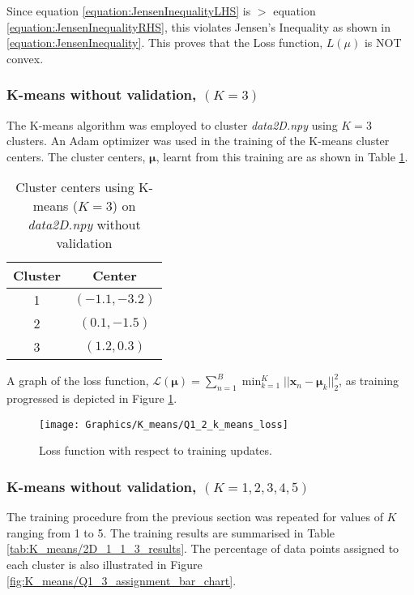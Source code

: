 \documentclass[a4paper,12pt]{article}
\newcommand{\x}{\mathbf{x}}
\newcommand{\means}{\bm{\mu}}
\begin{document}
Since equation \ref{equation:JensenInequalityLHS} is $>$ equation \ref{equation:JensenInequalityRHS}, this violates Jensen's Inequality as shown in \ref{equation:JensenInequality}. This proves that the Loss function, $L(\mu)$ is NOT convex. 

\clearpage
\subsubsection{K-means without validation, $(K = 3)$}
\label{sec:K_means/Q1.2_without_validation}
The K-means algorithm was employed to cluster \textit{data2D.npy} using $K = 3$ clusters. An Adam optimizer was used in the training of the K-means cluster centers. The cluster centers, $\means$, learnt from this training are as shown in Table \ref{tab:K_means/2D_1_1_2_centers}.

\begin{table}[!htb]
\centering
\caption{Cluster centers using K-means ($K=3$) on \textit{data2D.npy} without validation}
\label{tab:K_means/2D_1_1_2_centers}
\vspace{1em}
\begin{tabular}{|c|c|} \hline
Cluster & Center \\ \hline
1 & $(-1.1, -3.2)$ \\
2 & $(0.1, -1.5)$ \\
3 & $(1.2, 0.3)$ \\ \hline
\end{tabular}
\end{table}

A graph of the loss function, $\mathcal{L}(\means) = \sum_{n=1}^B \min_{k=1}^K || \x_n - \means_k ||_2^2$, as training progressed is depicted in Figure \ref{fig:K_means/Q1_2_loss_graph}.

\begin{figure}[!htb]
\centering
\texttt{[image: Graphics/K\_means/Q1\_2\_k\_means\_loss]}
\caption{Loss function with respect to training updates.}
\label{fig:K_means/Q1_2_loss_graph}
\end{figure}

\clearpage
\subsubsection{K-means without validation, $(K = 1, 2, 3, 4, 5)$}
The training procedure from the previous section was repeated for values of $K$ ranging from 1 to 5. The training results are summarised in Table \ref{tab:K_means/2D_1_1_3_results}. The percentage of data points assigned to each cluster is also illustrated in Figure \ref{fig:K_means/Q1_3_assignment_bar_chart}.
\end{document}
